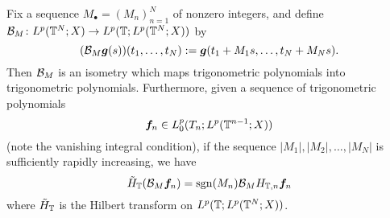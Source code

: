 \begin{lem}\label{lem:Bourgain}
  Fix a sequence $M_{\bullet} = (M_{n})_{n=1}^{N}$ of nonzero integers, and define $\mathcal{B}_{M} \colon L^p(\mathbb{T}^{N};X) \to L^{p}(\mathbb{T}; L^p(\mathbb{T}^{N};X))$ by
  \begin{equation*}
    (\mathcal{B}_{M} \bm{g}(s))(t_{1}, \ldots, t_{N}) := \bm{g}(t_{1} + M_{1} s, \ldots, t_{N} + M_{N} s).
  \end{equation*}
  Then $\mathcal{B}_{M}$ is an isometry which maps trigonometric polynomials into trigonometric polynomials.
  Furthermore, given a sequence of trigonometric polynomials
  \begin{equation*}
    \bm{f}_{n} \in L^p_{0}(T_{n}; L^p(\mathbb{T}^{n-1};X))
  \end{equation*}
  (note the vanishing integral condition), if the sequence $|M_{1}|, |M_{2}|, \ldots, |M_{N}|$ is sufficiently rapidly increasing, we have
  \begin{equation}\label{eq:B-ident}
    \tilde{H}_{\mathbb{T}} (\mathcal{B}_{M} \bm{f}_{n}) = \operatorname{sgn}(M_{n}) \mathcal{B}_{M} H_{\mathbb{T},n} \bm{f}_{n}
  \end{equation}
  where $\tilde{H}_{\mathbb{T}}$ is the Hilbert transform on $L^p(\mathbb{T}; L^p(\mathbb{T}^{N};X))$.
\end{lem}

